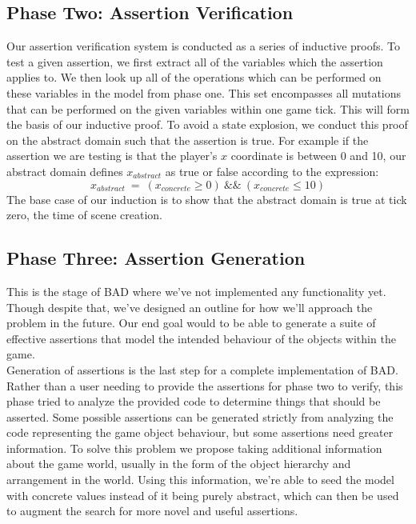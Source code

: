 \documentclass[letterpaper,twocolumn,10pt]{article}
\begin{document}
\subsection{Phase Two: Assertion Verification}

Our assertion verification system is conducted as a series of inductive proofs. To test a given assertion, we first extract all of the variables which the assertion applies to. We then look up all of the operations which can be performed on these variables in the model from phase one. This set encompasses all mutations that can be performed on the given variables within one game tick. This will form the basis of our inductive proof. To avoid a state explosion, we conduct this proof on the abstract domain such that the assertion is true. For example if the assertion we are testing is that the player's $x$ coordinate is between 0 and 10, our abstract domain defines $x_{abstract}$ as true or false according to the expression:
\begin{displaymath}x_{abstract}~=~(x_{concrete}\geq0)~\&\&~(x_{concrete}\leq10)
\end{displaymath}
The base case of our induction is to show that the abstract domain is true at tick zero, the time of scene creation. 

\subsection{Phase Three: Assertion Generation}

This is the stage of BAD where we've not implemented any functionality yet. Though despite that, we've designed an outline for how we'll approach the problem in the future. Our end goal would to be able to generate a suite of effective assertions that model the intended behaviour of the objects within the game. \\

Generation of assertions is the last step for a complete implementation of BAD. Rather than a user needing to provide the assertions for phase two to verify, this phase tried to analyze the provided code to determine things that should be asserted. Some possible assertions can be generated strictly from analyzing the code representing the game object behaviour, but some assertions need greater information. To solve this problem we propose taking additional information about the game world, usually in the form of the object hierarchy and arrangement in the world. Using this information, we're able to seed the model with concrete values instead of it being purely abstract, which can then be used to augment the search for more novel and useful assertions. \\
\end{document}
